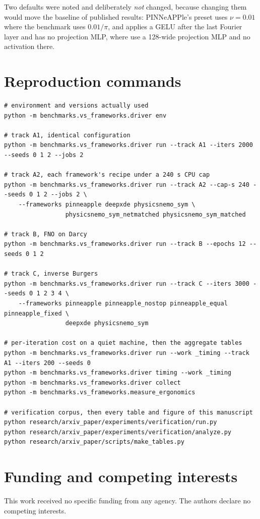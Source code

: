 \documentclass[11pt]{article}
\newcommand{\code}[1]{\protect\path{#1}\xspace}
\begin{document}
Two defaults were noted and deliberately \emph{not} changed, because changing them would move the
baseline of published results: PINNeAPPle's \code{burgers_1d} preset uses $\nu=0.01$ where the
benchmark uses $0.01/\pi$, and \code{FNO2d} applies a GELU after the last Fourier layer and has no
projection MLP, where \citet{li2021fno} use a 128-wide projection MLP and no activation there.

\section{Reproduction commands}\label{app:reproduce}

\begin{Verbatim}[fontsize=\footnotesize]
# environment and versions actually used
python -m benchmarks.vs_frameworks.driver env

# track A1, identical configuration
python -m benchmarks.vs_frameworks.driver run --track A1 --iters 2000 --seeds 0 1 2 --jobs 2

# track A2, each framework's recipe under a 240 s CPU cap
python -m benchmarks.vs_frameworks.driver run --track A2 --cap-s 240 --seeds 0 1 2 --jobs 2 \
    --frameworks pinneapple deepxde physicsnemo_sym \
                 physicsnemo_sym_netmatched physicsnemo_sym_matched

# track B, FNO on Darcy
python -m benchmarks.vs_frameworks.driver run --track B --epochs 12 --seeds 0 1 2

# track C, inverse Burgers
python -m benchmarks.vs_frameworks.driver run --track C --iters 3000 --seeds 0 1 2 3 4 \
    --frameworks pinneapple pinneapple_nostop pinneapple_equal pinneapple_fixed \
                 deepxde physicsnemo_sym

# per-iteration cost on a quiet machine, then the aggregate tables
python -m benchmarks.vs_frameworks.driver run --work _timing --track A1 --iters 200 --seeds 0
python -m benchmarks.vs_frameworks.driver timing --work _timing
python -m benchmarks.vs_frameworks.driver collect
python -m benchmarks.vs_frameworks.measure_ergonomics

# verification corpus, then every table and figure of this manuscript
python research/arxiv_paper/experiments/verification/run.py
python research/arxiv_paper/experiments/verification/analyze.py
python research/arxiv_paper/scripts/make_tables.py
\end{Verbatim}

\section*{Funding and competing interests}

This work received no specific funding from any agency. The authors declare no competing interests.



\end{document}

